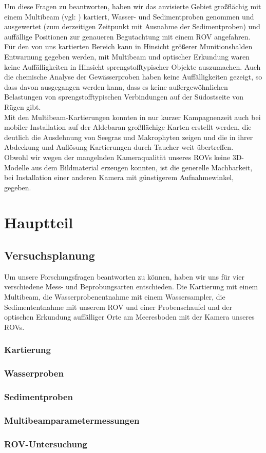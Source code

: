 \documentclass[12pt,titlepage]{scrreprt}
\begin{document}
Um diese Fragen zu beantworten, haben wir das anvisierte Gebiet großflächig mit einem Multibeam (vgl: \cite{multib}) kartiert, Wasser- und Sedimentproben genommen und ausgewertet (zum derzeitigen Zeitpunkt mit Ausnahme der Sedimentproben) und auffällige Positionen zur genaueren Begutachtung mit einem ROV angefahren.\\
Für den von uns kartierten Bereich kann in Hinsicht größerer Munitionshalden Entwarnung gegeben werden, mit Multibeam und optischer Erkundung waren keine Auffälligkeiten in Hinsicht sprengstofftypischer Objekte auszumachen. Auch die chemische Analyse der Gewässerproben haben keine Auffälligkeiten gezeigt, so dass davon ausgegangen werden kann, dass es keine außergewöhnlichen Belastungen von sprengstofftypischen Verbindungen auf der Südostseite von Rügen gibt.\\
Mit den Multibeam-Kartierungen konnten in nur kurzer Kampagnenzeit auch bei mobiler Installation auf der Aldebaran großflächige Karten erstellt werden, die deutlich die Ausdehnung von Seegras und Makrophyten zeigen und die in ihrer Abdeckung und Auflösung Kartierungen durch Taucher weit übertreffen. \\
Obwohl wir wegen der mangelnden Kameraqualität unseres ROVs keine 3D-Modelle aus dem Bildmaterial erzeugen konnten, ist die generelle Machbarkeit, bei Installation einer anderen Kamera mit günstigerem Aufnahmewinkel, gegeben.

\tableofcontents

\chapter{Hauptteil}
\section{Versuchsplanung}
Um unsere Forschungsfragen beantworten zu können, haben wir uns für vier verschiedene Mess- und Beprobungsarten entschieden. Die Kartierung mit einem Multibeam, die Wasserprobenentnahme mit einem Wassersampler, die Sedimententnahme mit unserem ROV und einer Probenschaufel und der optischen Erkundung auffälliger Orte am Meeresboden mit der Kamera unseres ROVs.
\subsection{Kartierung}

\subsection{Wasserproben}

\subsection{Sedimentproben}

\subsection{Multibeamparametermessungen}

\subsection{ROV-Untersuchung}







\end{document}
